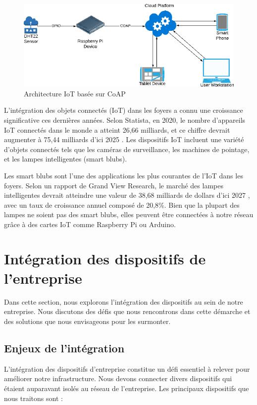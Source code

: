 \begin{figure}[H]
\centering
\includegraphics[width=15cm]{Images/IoT-Topo2.png}
\caption{Architecture IoT basée sur CoAP}
\label{Chap4.2.1}
\end{figure}


L'intégration des objets connectés (IoT) dans les foyers a connu une croissance significative ces dernières années. Selon Statista, en 2020, le nombre d'appareils IoT connectés dans le monde a atteint 26,66 milliards, et ce chiffre devrait augmenter à 75,44 milliards d'ici 2025 \cite{statista-iot-2025}. Les dispositifs IoT incluent une variété d'objets connectés tels que les caméras de surveillance, les machines de pointage, et les lampes intelligentes (smart blubs). 

Les smart blubs sont l'une des applications les plus courantes de l'IoT dans les foyers. Selon un rapport de Grand View Research, le marché des lampes intelligentes devrait atteindre une valeur de 38,68 milliards de dollars d'ici 2027 \cite{market-splash-automation}, avec un taux de croissance annuel composé de 20,8\%. Bien que la plupart des lampes ne soient pas des smart blubs, elles peuvent être connectées à notre réseau grâce à des cartes IoT comme Raspberry Pi ou Arduino.


\section{Intégration des dispositifs de l'entreprise}

Dans cette section, nous explorons l'intégration des dispositifs au sein de notre entreprise. Nous discutons des défis que nous rencontrons dans cette démarche et des solutions que nous envisageons pour les surmonter.

\subsection{Enjeux de l'intégration}

L'intégration des dispositifs d'entreprise constitue un défi essentiel à relever pour améliorer notre infrastructure. Nous devons connecter divers dispositifs qui étaient auparavant isolés au réseau de l'entreprise. Les principaux dispositifs que nous traitons sont :


